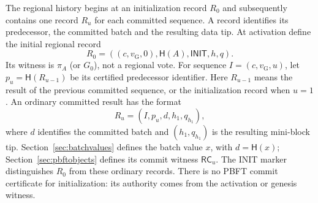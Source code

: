 \documentclass[11pt,a4paper,onecolumn]{article}
\newcommand{\Hash}{\mathsf H}
\newcommand{\RC}{\mathsf{RC}}
\newcommand{\gv}{v_{\mathrm G}}
\newcommand{\Tag}[1]{\mathsf{#1}}
\theoremstyle{remark}\newtheorem{example}[definition]{Example}
\begin{document}
The regional history begins at an initialization record $R_0$ and subsequently
contains one record $R_u$ for each committed sequence. A record identifies its
predecessor, the committed batch and the resulting data tip. At activation
define the initial regional record
\[
 R_0=((c,\gv,0),\Hash(A),\Tag{INIT},h,q).
\]
Its witness is $\pi_A$ (or $G_0$), not a regional vote. For sequence
$I=(c,\gv,u)$, let $p_u=\Hash(R_{u-1})$ be its certified predecessor identifier.
Here $R_{u-1}$ means the result of the previous committed sequence, or the
initialization record when $u=1$. An ordinary committed result has the format
\[
 R_u=(I,p_u,d,h_1,q_{h_1}),
\]
where $d$ identifies the committed batch and $(h_1,q_{h_1})$ is the resulting
mini-block tip. Section~\ref{sec:batchvalues} defines the batch value $x$, with
$d=\Hash(x)$; Section~\ref{sec:pbftobjects} defines its commit witness $\RC_u$.
The INIT marker distinguishes $R_0$ from these ordinary records. There is no
PBFT commit certificate for initialization: its authority comes from the
activation or genesis witness.
\end{document}
